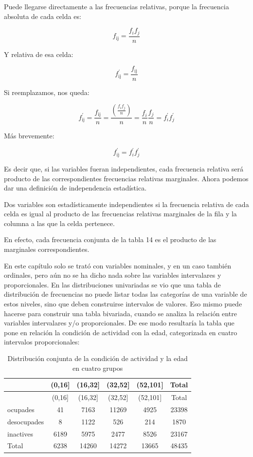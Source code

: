 \documentclass[]{book}
\begin{document}
Puede llegarse directamente a las frecuencias relativas, porque la
frecuencia absoluta de cada celda es:

\[f_{\text{ij}} = \frac{f_{i}f_{j}}{n}\]

Y relativa de esa celda:

\[f_{\text{ij}}^{'} = \frac{f_{\text{ij}}}{n}\]

Si reemplazamos, nos queda:

\[f_{\text{ij}}^{'} = \frac{f_{\text{ij}}}{n} = \frac{\left( \frac{f_{i}f_{j}}{n} \right)}{n} = \frac{f_{i}}{n}\frac{f_{j}}{n} = f_{i}^{'}f_{j}^{'}\]

Más brevemente:

\[f_{\text{ij}}^{'} = f_{i}^{'}f_{j}^{'}\]

Es decir que, si las variables fueran independientes, cada frecuencia
relativa será producto de las correspondientes frecuencias relativas
marginales. Ahora podemos dar una definición de independencia
estadística.

Dos variables son estadísticamente independientes si la frecuencia
relativa de cada celda es igual al producto de las frecuencias relativas marginales de la fila y la columna a las que la celda pertenece.

En efecto, cada frecuencia conjunta de la tabla 14 es el producto de las marginales correspondientes.

En este capítulo solo se trató con variables nominales, y en un caso también ordinales, pero aún no se ha dicho nada sobre las variables intervalares y proporcionales. En las distribuciones univariadas se vio que una tabla de distribución de frecuencias no puede listar todas las categorías de una variable de estos niveles, sino que deben construirse intervalos de valores. Eso mismo puede hacerse para construir una tabla bivariada, cuando se analiza la relación entre variables intervalares y/o proporcionales. De ese modo resultaría la tabla que pone en relación la condición de actividad con la edad, categorizada en cuatro intervalos proporcionales:

\begin{longtable}[]{@{}lccccc@{}}
\caption{\label{tab:unnamed-chunk-126}Distribución conjunta de la condición de actividad y la edad en cuatro grupos}\tabularnewline
\toprule
& (0,16{]} & (16,32{]} & (32,52{]} & (52,101{]} & Total\tabularnewline
\midrule
\endfirsthead
\toprule
& (0,16{]} & (16,32{]} & (32,52{]} & (52,101{]} & Total\tabularnewline
\midrule
\endhead
ocupades & 41 & 7163 & 11269 & 4925 & 23398\tabularnewline
desocupades & 8 & 1122 & 526 & 214 & 1870\tabularnewline
inactives & 6189 & 5975 & 2477 & 8526 & 23167\tabularnewline
Total & 6238 & 14260 & 14272 & 13665 & 48435\tabularnewline
\bottomrule
\end{longtable}
\end{document}
